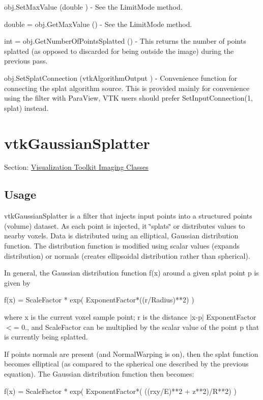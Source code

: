\begin{DoxyItemize}
\item {\ttfamily obj.\-Set\-Max\-Value (double )} -\/ See the Limit\-Mode method.  
\item {\ttfamily double = obj.\-Get\-Max\-Value ()} -\/ See the Limit\-Mode method.  
\item {\ttfamily int = obj.\-Get\-Number\-Of\-Points\-Splatted ()} -\/ This returns the number of points splatted (as opposed to discarded for being outside the image) during the previous pass.  
\item {\ttfamily obj.\-Set\-Splat\-Connection (vtk\-Algorithm\-Output )} -\/ Convenience function for connecting the splat algorithm source. This is provided mainly for convenience using the filter with Para\-View, V\-T\-K users should prefer Set\-Input\-Connection(1, splat) instead.  
\end{DoxyItemize}\hypertarget{vtkimaging_vtkgaussiansplatter}{}\section{vtk\-Gaussian\-Splatter}\label{vtkimaging_vtkgaussiansplatter}
Section\-: \hyperlink{sec_vtkimaging}{Visualization Toolkit Imaging Classes} \hypertarget{vtkwidgets_vtkxyplotwidget_Usage}{}\subsection{Usage}\label{vtkwidgets_vtkxyplotwidget_Usage}
vtk\-Gaussian\-Splatter is a filter that injects input points into a structured points (volume) dataset. As each point is injected, it \char`\"{}splats\char`\"{} or distributes values to nearby voxels. Data is distributed using an elliptical, Gaussian distribution function. The distribution function is modified using scalar values (expands distribution) or normals (creates ellipsoidal distribution rather than spherical).

In general, the Gaussian distribution function f(x) around a given splat point p is given by \begin{DoxyVerb}f(x) = ScaleFactor * exp( ExponentFactor*((r/Radius)**2) )
\end{DoxyVerb}


where x is the current voxel sample point; r is the distance $|$x-\/p$|$ Exponent\-Factor $<$= 0., and Scale\-Factor can be multiplied by the scalar value of the point p that is currently being splatted.

If points normals are present (and Normal\-Warping is on), then the splat function becomes elliptical (as compared to the spherical one described by the previous equation). The Gaussian distribution function then becomes\-: \begin{DoxyVerb}f(x) = ScaleFactor * 
          exp( ExponentFactor*( ((rxy/E)**2 + z**2)/R**2) )
\end{DoxyVerb}


